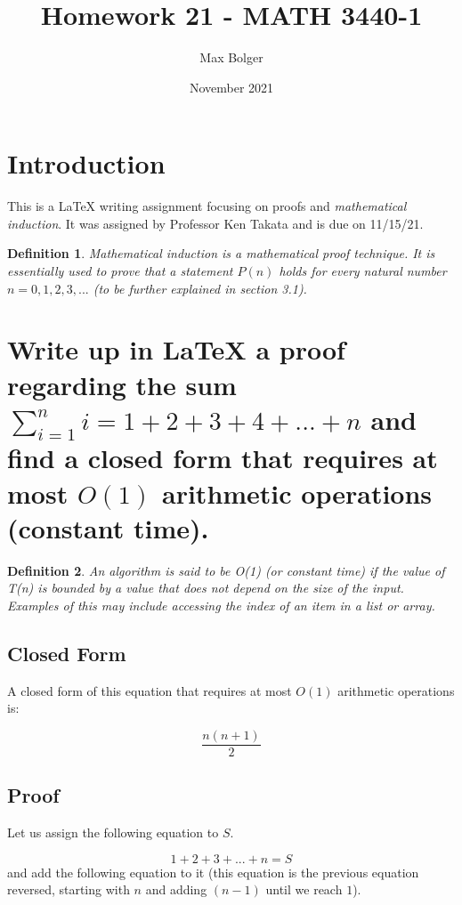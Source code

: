 \documentclass{article}
\title{Homework 21 - MATH 3440-1}
\author{Max Bolger}
\date{November 2021}
\newtheorem{definition}{Definition}
\begin{document}
\maketitle

\section{Introduction} This is a LaTeX writing assignment focusing on proofs and \textit{mathematical induction}. It was assigned by Professor Ken Takata and is due on 11/15/21.

\begin{definition}
Mathematical induction is a mathematical proof technique. It is essentially used to prove that a statement $P(n)$ holds for every natural number $n = 0, 1, 2, 3, ...$ (to be further explained in section 3.1).
\end{definition}

\section{Write up in LaTeX a proof regarding the sum $\sum_{i=1}^{n} i = 1 + 2 + 3 + 4 + ... + n$ and find a closed form that requires at most $O(1)$ arithmetic operations (constant time).}

\begin{definition}
An algorithm is said to be O(1) (or constant time) if the value of T(n) is bounded by a value that does not depend on the size of the input. Examples of this may include accessing the index of an item in a list or array.
\end{definition}

\subsection{Closed Form}
A closed form of this equation that requires at most $O(1)$ arithmetic operations is:

\begin{equation}
\frac{n(n+1)}{2}
\end{equation}

\subsection{Proof}
Let us assign the following equation to $S$.

\begin{equation}
1 + 2 + 3 + ... + n = S
\end{equation}
\newline
and add the following equation to it (this equation is the previous equation reversed, starting with $n$ and adding $(n-1)$ until we reach $1$).
\end{document}
